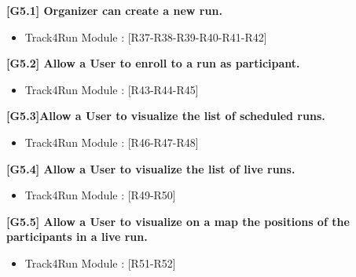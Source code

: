 \textbf{[G5.1] Organizer can create a new run.}
\begin{itemize}
	\item Track4Run Module : [R37-R38-R39-R40-R41-R42]
\end{itemize}

\textbf{[G5.2] Allow a User to enroll to a run as participant.}
\begin{itemize}
	\item Track4Run Module : [R43-R44-R45]
\end{itemize}

\textbf{[G5.3]Allow a User to visualize the list of scheduled runs.}
\begin{itemize}
	\item Track4Run Module : [R46-R47-R48]
\end{itemize}

\textbf{[G5.4] Allow a User to visualize the list of live runs.}
\begin{itemize}
	\item Track4Run Module : [R49-R50]
\end{itemize}

\textbf{[G5.5] Allow a User to visualize on a map the positions of the participants
in a live run.}
\begin{itemize}
	\item Track4Run Module : [R51-R52]
\end{itemize}








 

  